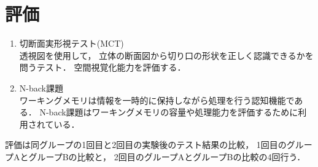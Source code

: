\section{評価}
  \begin{enumerate}
    \item 切断面実形視テスト(MCT)\cite{MCT} \mbox{}\\
      透視図を使用して，
      立体の断面図から切り口の形状を正しく認識できるかを問うテスト．
      空間視覚化能力を評価する．
    \item N-back課題 \mbox{}\\
      ワーキングメモリは情報を一時的に保持しながら処理を行う認知機能である．
      N-back課題はワーキングメモリの容量や処理能力を評価するために利用されている\cite{N-back}．
  \end{enumerate}

  評価は同グループの1回目と2回目の実験後のテスト結果の比較，
  1回目のグループAとグループBの比較と，
  2回目のグループAとグループBの比較の4回行う．
